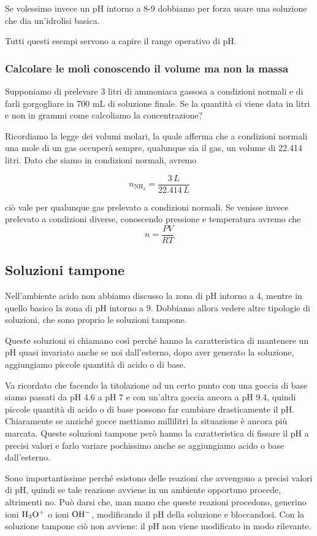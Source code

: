 Se volessimo invece un pH intorno a 8-9 dobbiamo per forza usare una soluzione che dia un'idrolisi basica.

Tutti questi esempi servono a capire il range operativo di pH.

\subsubsection{Calcolare le moli conoscendo il volume ma non la massa}
Supponiamo di prelevare 3 litri di ammoniaca gassosa a condizioni normali e di farli gorgogliare in 700 mL di soluzione finale. Se la quantità ci viene data in litri e non in grammi come calcoliamo la concentrazione?

Ricordiamo la legge dei volumi molari, la quale afferma che a condizioni normali una mole di un gas occuperà sempre, qualunque sia il gas, un volume di 22.414 litri. Dato che siamo in condizioni normali, avremo

$$n_{\text{NH}_3}=\frac{3 \, L}{22.414 \, L}$$

ciò vale per qualunque gas prelevato a condizioni normali. Se venisse invece prelevato a condizioni diverse, conoscendo pressione e temperatura avremo che
$$n=\frac{PV}{RT}$$
\subsection{Soluzioni tampone}
Nell'ambiente acido non abbiamo discusso la zona di pH intorno a 4, mentre in quello basico la zona di pH intorno a 9. Dobbiamo allora vedere altre tipologie di soluzioni, che sono proprio le soluzioni tampone.

Queste soluzioni si chiamano così perché hanno la caratteristica di mantenere un pH quasi invariato anche se noi dall'esterno, dopo aver generato la soluzione, aggiungiamo piccole quantità di acido o di base.

Va ricordato che facendo la titolazione ad un certo punto con una goccia di base siamo passati da pH 4.6 a pH 7 e con un'altra goccia ancora a pH 9.4, quindi piccole quantità di acido o di base possono far cambiare drasticamente il pH. Chiaramente se anziché gocce mettiamo millilitri la situazione è ancora più marcata. Queste soluzioni tampone però hanno la caratteristica di fissare il pH a precisi valori e farlo variare pochissimo anche se aggiungiamo acido o base dall'esterno.

Sono importantissime perché esistono delle reazioni che avvengono a precisi valori di pH, quindi se tale reazione avviene in un ambiente opportuno procede, altrimenti no. Può darsi che, man mano che queste reazioni procedono, generino ioni $\rm H_3O^+$ o ioni $\rm OH^-$, modificando il pH della soluzione e bloccandosi. Con la soluzione tampone ciò non avviene: il pH non viene modificato in modo rilevante.

